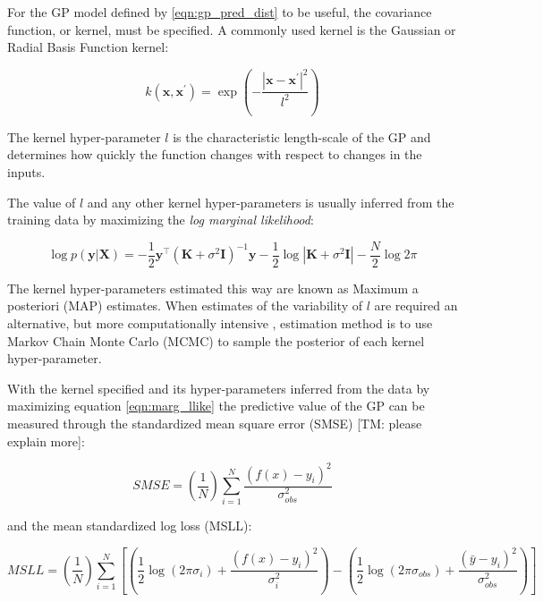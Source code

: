 For the GP model defined by \ref{eqn:gp_pred_dist} to be useful, the covariance function, or kernel, must be specified. A commonly used kernel is the Gaussian or Radial Basis Function kernel: 

\begin{equation}
    k(\mathbf{x}, \mathbf{x}^{\prime}) = \exp{\left(-\frac{\left|\mathbf{x}-\mathbf{x}^{\prime}\right|^{2}}{l^{2}}\right)}
\end{equation}

The kernel hyper-parameter $l$ is the characteristic length-scale of the GP and determines how quickly the function changes with respect to changes in the inputs. 

The value of $l$ and any other kernel hyper-parameters is usually inferred from the training data by maximizing the \emph{log marginal likelihood}:

\begin{equation}\label{eqn:marg_llike}
\log p(\mathbf{y} | \mathbf{X})=-\frac{1}{2} \mathbf{y}^{\top}\left(\mathbf{K}+\sigma^{2} \mathbf{I}\right)^{-1} \mathbf{y}-\frac{1}{2} \log \left|\mathbf{K}+\sigma^{2} \mathbf{I}\right|-\frac{N}{2} \log 2 \pi
\end{equation}

The kernel hyper-parameters estimated this way are known as Maximum a posteriori (MAP) estimates. When estimates of the variability of $l$ are required an alternative, but more computationally intensive , estimation method is to use Markov Chain Monte Carlo (MCMC) to sample the posterior of each kernel hyper-parameter. 

With the kernel specified and its hyper-parameters inferred from the data by maximizing equation \ref{eqn:marg_llike} the predictive value of the GP can be measured through the standardized mean square error (SMSE) [TM: please explain more]: 

\begin{equation}\label{eqn:smse}
SMSE =\left(\frac{1}{N}\right) \sum_{i=1}^{N} \frac{\left(f(x)-y_{i}\right)^{2}}{\sigma_{obs}^{2}}
\end{equation}

and the mean standardized log loss (MSLL): 

\begin{equation}\label{eqn:msll}
MSLL=\left(\frac{1}{N}\right) \sum_{i=1}^{N}\left[\left(\frac{1}{2} \log \left(2 \pi \sigma_{i}\right)+\frac{\left(f(x)-y_{i}\right)^{2}}{\sigma_{i}^{2}}\right)-\left(\frac{1}{2} \log \left(2 \pi \sigma_{obs}\right)+\frac{\left(\bar{y}-y_{i}\right)^{2}}{\sigma_{obs}^{2}}\right)\right]
\end{equation}  

